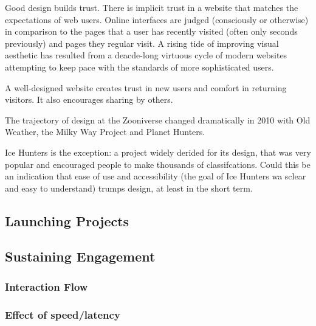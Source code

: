 \documentclass{sigchi}
\begin{document}


Good design builds trust. There is implicit trust in a website that matches the expectations of web users. Online interfaces are judged (consciously or otherwise) in comparison to the pages that a user has recently visited (often only seconds previously) and pages they regular visit. A rising tide of improving visual aesthetic has resulted from a deacde-long virtuous cycle of modern websites attempting to keep pace with the standards of more sophisticated users.

A well-designed website creates trust in new users and comfort in returning visitors. It also encourages sharing by others.

The trajectory of design at the Zooniverse changed dramatically in 2010 with Old Weather, the Milky Way Project and Planet Hunters. %

Ice Hunters is the exception: a project widely derided for its design, that was very popular and encouraged people to make thousands of classifcations. Could this be an indication that ease of use and accessibility (the goal of Ice Hunters wa sclear and easy to understand) trumps design, at least in the short term.

\subsection{Launching Projects}

\subsection{Sustaining Engagement}


\subsubsection{Interaction Flow}

\subsubsection{Effect of speed/latency}
\end{document}
